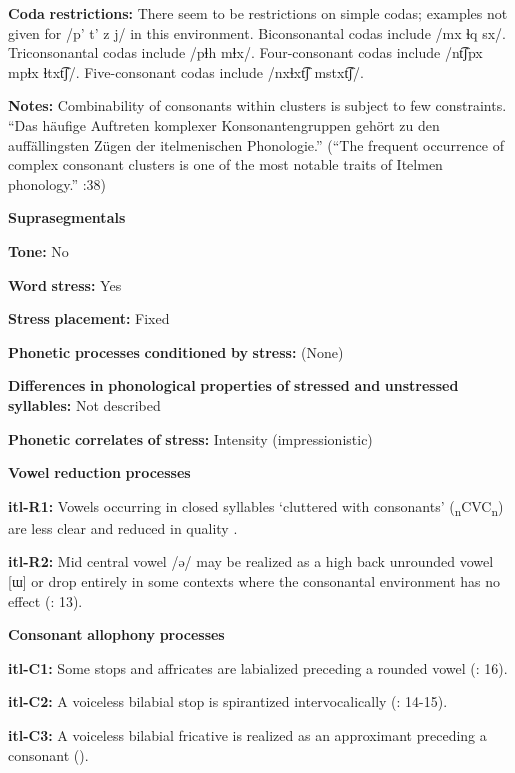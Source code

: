 \begin{styleBody}
\textbf{Coda} \textbf{restrictions:} There seem to be restrictions on simple codas; examples not given for /p’ t’ z j/ in this environment. Biconsonantal codas include /mx ɬq sx/. Triconsonantal codas include /pɬh mɬx/. Four-consonant codas include /nt͡ʃpx mpɬx ɬtxt͡ʃ/. Five-consonant codas include /nxɬxt͡ʃ mstxt͡ʃ/.

\textbf{Notes:} Combinability of consonants within clusters is subject to few constraints. “Das häufige Auftreten komplexer Konsonantengruppen gehört zu den auffällingsten Zügen der itelmenischen Phonologie.” (“The frequent occurrence of complex consonant clusters is one of the most notable traits of Itelmen phonology.” \citealt{GeorgVolodin1999}:38)

\textbf{Suprasegmentals}

\textbf{Tone:} No

\textbf{Word} \textbf{stress:} Yes

\textbf{Stress} \textbf{placement:} Fixed

\textbf{Phonetic} \textbf{processes} \textbf{conditioned} \textbf{by} \textbf{stress:} (None)

\textbf{Differences} \textbf{in} \textbf{phonological} \textbf{properties} \textbf{of} \textbf{stressed} \textbf{and} \textbf{unstressed} \textbf{syllables:} Not described

\textbf{Phonetic} \textbf{correlates} \textbf{of} \textbf{stress:} Intensity (impressionistic)

\textbf{Vowel} \textbf{reduction} \textbf{processes}

\textbf{itl-R1:} Vowels occurring in closed syllables ‘cluttered with consonants’ (\textsubscript{n}CVC\textsubscript{n}) are less clear and reduced in quality \citep[73]{Volodin1976}.

\textbf{itl-R2:} Mid central vowel /ə/ may be realized as a high back unrounded vowel [ɯ] or drop entirely in some contexts where the consonantal environment has no effect (\citealt{GeorgVolodin1999}: 13).

\textbf{Consonant} \textbf{allophony} \textbf{processes}

\textbf{itl-C1:} Some stops and affricates are labialized preceding a rounded vowel (\citealt{GeorgVolodin1999}: 16).

\textbf{itl-C2:} A voiceless bilabial stop is spirantized intervocalically (\citealt{GeorgVolodin1999}: 14-15).

\textbf{itl-C3:} A voiceless bilabial fricative is realized as an approximant preceding a consonant (\citealt{GeorgVolodin1999}).


\end{styleBody}
